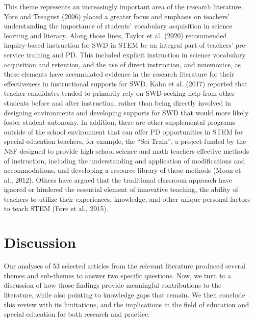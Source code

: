 \documentclass[11pt]{sig-alternate}
\begin{document}
\begin{large}
This theme represents an increasingly important area of the research literature. Yore and Treagust (2006) placed a greater focus and emphasis on teachers’ understanding the importance of students’ vocabulary acquisition in science learning and literacy. Along those lines, Taylor et al. (2020) recommended inquiry-based instruction for SWD in STEM be an integral part of teachers’ pre-service training and PD. This included explicit instruction in science vocabulary acquisition and retention, and the use of direct instruction, and mnemonics, as these elements have accumulated evidence in the research literature for their effectiveness in instructional supports for SWD. Kahn et al. (2017) reported that teacher candidates tended to primarily rely on SWD seeking help from other students before and after instruction, rather than being directly involved in designing environments and developing supports for SWD that would more likely foster student autonomy. In addition, there are other supplemental programs outside of the school environment that can offer PD opportunities in STEM for special education teachers, for example, the “Sci Train”, a project funded by the NSF designed to provide high-school science and math teachers effective methods of instruction, including the understanding and application of modifications and accommodations, and developing a resource library of these methods (Moon et al., 2012). Others have argued that the traditional classroom approach have ignored or hindered the essential element of innovative teaching, the ability of teachers to utilize their experiences, knowledge, and other unique personal factors to teach STEM (Fore et al., 2015).    

\section*{Discussion}
Our analyses of 53 selected articles from the relevant literature produced several themes and sub-themes to answer two specific questions. Now, we turn to a discussion of how those findings provide meaningful contributions to the literature, while also pointing to  knowledge gaps that remain. We then conclude this review with its limitations, and the implications in the field of education and special education for both research and practice.  


\end{large}
\end{document}
